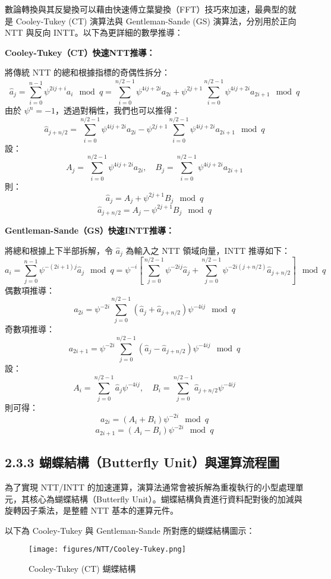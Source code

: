\documentclass[12pt, a4paper, fleqn]{./styles/ntust_report}
\begin{document}
數論轉換與其反變換可以藉由快速傅立葉變換（FFT）技巧來加速，最典型的就是 Cooley-Tukey (CT) 演算法與 Gentleman-Sande (GS) 演算法，分別用於正向 NTT 與反向 INTT。以下為更詳細的數學推導：

\textbf{Cooley-Tukey（CT）快速NTT推導：}

將傳統 NTT 的總和根據指標的奇偶性拆分：
\[
\hat{a}_j = \sum_{i=0}^{n-1} \psi^{2ij+i} a_i \mod q = \sum_{i=0}^{n/2-1} \psi^{4ij+2i} a_{2i} + \psi^{2j+1} \sum_{i=0}^{n/2-1} \psi^{4ij+2i} a_{2i+1} \mod q
\]
由於 $\psi^{n} = -1$，透過對稱性，我們也可以推得：
\[
\hat{a}_{j+n/2} = \sum_{i=0}^{n/2-1} \psi^{4ij+2i} a_{2i} - \psi^{2j+1} \sum_{i=0}^{n/2-1} \psi^{4ij+2i} a_{2i+1} \mod q
\]
設：
\[
A_j = \sum_{i=0}^{n/2-1} \psi^{4ij+2i} a_{2i}, \quad B_j = \sum_{i=0}^{n/2-1} \psi^{4ij+2i} a_{2i+1}
\]
則：
\[
\hat{a}_j = A_j + \psi^{2j+1} B_j \mod q
\]
\[
\hat{a}_{j+n/2} = A_j - \psi^{2j+1} B_j \mod q
\]


\textbf{Gentleman-Sande（GS）快速INTT推導：}

將總和根據上下半部拆解，令 $\hat{a}_j$ 為輸入之 NTT 領域向量，INTT 推導如下：
\[
a_i = \sum_{j=0}^{n-1} \psi^{-(2i+1)j} \hat{a}_j \mod q = \psi^{-i} \left[ \sum_{j=0}^{n/2-1} \psi^{-2ij} \hat{a}_j + \sum_{j=0}^{n/2-1} \psi^{-2i(j + n/2)} \hat{a}_{j + n/2} \right] \mod q
\]
偶數項推導：
\[
a_{2i} = \psi^{-2i} \sum_{j=0}^{n/2-1} \left( \hat{a}_j + \hat{a}_{j+n/2} \right) \psi^{-4ij} \mod q
\]
奇數項推導：
\[
a_{2i+1} = \psi^{-2i} \sum_{j=0}^{n/2-1} \left( \hat{a}_j - \hat{a}_{j+n/2} \right) \psi^{-4ij} \mod q
\]
設：
\[
A_i = \sum_{j=0}^{n/2-1} \hat{a}_j \psi^{-4ij}, \quad B_i = \sum_{j=0}^{n/2-1} \hat{a}_{j+n/2} \psi^{-4ij}
\]
則可得：
\[
a_{2i} = (A_i + B_i) \psi^{-2i} \mod q
\]
\[
a_{2i+1} = (A_i - B_i) \psi^{-2i} \mod q
\]


\subsection{2.3.3 蝴蝶結構（Butterfly Unit）與運算流程圖}

為了實現 NTT/INTT 的加速運算，演算法通常會被拆解為重複執行的小型處理單元，其核心為蝴蝶結構（Butterfly Unit）。蝴蝶結構負責進行資料配對後的加減與旋轉因子乘法，是整體 NTT 基本的運算元件。

以下為 Cooley-Tukey 與 Gentleman-Sande 所對應的蝴蝶結構圖示：

\begin{figure}[H]
    \centering
    \texttt{[image: figures/NTT/Cooley-Tukey.png]}
    \caption{Cooley-Tukey (CT) 蝴蝶結構}
    \label{fig:ct-butterfly}
\end{figure}
\end{document}
